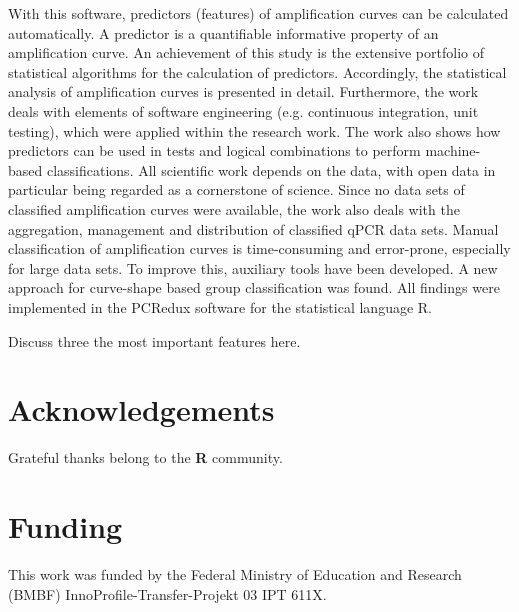 \documentclass{bioinfo}
\begin{document}
With this software, predictors (features) of amplification curves can be calculated automatically. A
predictor is a quantifiable informative property of an amplification curve. An achievement of
this study is the extensive portfolio of statistical algorithms for the calculation of predictors.
Accordingly, the statistical analysis of amplification curves is presented in detail. Furthermore,
the work deals with elements of software engineering (e.g. continuous integration, unit testing),
which were applied within the research work. The work also shows how predictors can be used
in tests and logical combinations to perform machine-based classifications.
All scientific work depends on the data, with open data in particular being regarded as a
cornerstone of science. Since no data sets of classified amplification curves were available, the
work also deals with the aggregation, management and distribution of classified qPCR data
sets. Manual classification of amplification curves is time-consuming and error-prone, especially
for large data sets. To improve this, auxiliary tools have been developed. A new approach for
curve-shape based group classification was found.
All findings were implemented in the PCRedux software for the statistical
language R.

Discuss three the most important features here.

\section*{Acknowledgements}

Grateful thanks belong to the \textbf{R} community.\vspace*{-12pt}

\section*{Funding}

This work was funded by the Federal Ministry of Education and Research (BMBF) InnoProfile-Transfer-Projekt 03 IPT 611X.\vspace*{-12pt}


%
%
%
%
%
%
%




\end{document}

